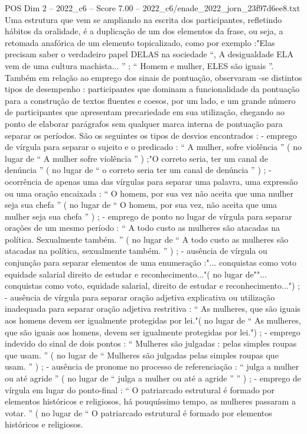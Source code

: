 \begin{textsample}{POS Dim 2 – 2022\_c6 – Score 7.00 – 2022\_c6/enade\_2022\_jorn\_23f97d6ee8.txt}
Uma estrutura que vem se ampliando na escrita dos participantes, refletindo hábitos da oralidade, é a duplicação de um dos elementos da frase, ou seja, a retomada anafórica de um elemento topicalizado, como por exemplo :"Elas precisam saber o verdadeiro papel DELAS na sociedade “, A desigualdade ELA vem de uma cultura machista... ” ; “ Homem e mulher, ELES são iguais ”.
Também em relação ao emprego dos sinais de pontuação, observaram -se distintos tipos de desempenho : participantes que dominam a funcionalidade da pontuação para a construção de textos fluentes e coesos, por um lado, e um grande número de participantes que apresentam precariedade em sua utilização, chegando ao ponto de elaborar parágrafos sem qualquer marca interna de pontuação para separar os períodos.
São os seguintes os tipos de desvios encontrados : - emprego de vírgula para separar o sujeito e o predicado : “ A mulher, sofre violência ” ( no lugar de “ A mulher sofre violência ” ) ;"O correto seria, ter um canal de denúncia ” ( no lugar de “ o correto seria ter um canal de denúncia ” ) ; - ocorrência de apenas uma das vírgulas para separar uma palavra, uma expressão ou uma oração encaixada : “ O homem, por sua vez não aceita que uma mulher seja sua chefa ” ( no lugar de “ O homem, por sua vez, não aceita que uma mulher seja sua chefa ” ) ; - emprego de ponto no lugar de vírgula para separar orações de um mesmo período : “ A todo custo as mulheres são atacadas na política.
Sexualmente também. ” ( no lugar de “ A todo custo as mulheres são atacadas na política, sexualmente também. ” ) ; - ausência de vírgula ou conjunção para separar elementos de uma enumeração :"... conquistas como voto equidade salarial direito de estudar e reconhecimento..."( no lugar de""... conquistas como voto, equidade salarial, direito de estudar e reconhecimento...") ; - ausência de vírgula para separar oração adjetiva explicativa ou utilização inadequada para separar oração adjetiva restritiva : “ As mulheres, que são iguais aos homens devem ser igualmente protegidas por lei."( no lugar de “ As mulheres, que são iguais aos homens, devem ser igualmente protegidas por lei.") ; - emprego indevido do sinal de dois pontos : “ Mulheres são julgadas : pelas simples roupas que usam. ” ( no lugar de “ Mulheres são julgadas pelas simples roupas que usam. ” ) ; - ausência de pronome no processo de referenciação : “ julga a mulher ou até agride ” ( no lugar de “ julga a mulher ou até a agride ” ” ) ; - emprego de vírgula em lugar do ponto-final : “ O patriarcado estrutural é formado por elementos históricos e religiosos, há pouquíssimo tempo, as mulheres passaram a votar. ” ( no lugar de “ O patriarcado estrutural é formado por elementos históricos e religiosos.

\end{textsample}
